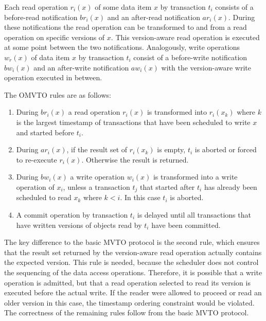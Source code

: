 \documentclass[10pt,final,journal]{IEEEtran}
\begin{document}
Each read operation $r_i(x)$ of some data item $x$ by transaction $t_i$ consists of a before-read notification $br_i(x)$ and an after-read notification $ar_i(x)$. During these notifications the read operation can be transformed to and from a read operation on specific versions of $x$. This version-aware read operation is executed at some point between the two notifications. Analogously,  write operations $w_r(x)$ of data item $x$ by transaction $t_i$ consist of a before-write notification $bw_i(x)$ and an after-write notification $aw_i(x)$ with the version-aware write operation executed in between.

The OMVTO rules are as follows:
\begin{enumerate}
\item During $br_i(x)$ a read operation $r_i(x)$ is transformed into $r_i(x_k)$ where $k$ is the largest timestamp of transactions that have been scheduled to write $x$ and started before $t_i$.
\item During $ar_i(x)$, if the result set of $r_i(x_k)$ is empty, $t_i$ is aborted or forced to re-execute $r_i(x)$. Otherwise the result is returned.
\item During $bw_i(x)$ a write operation $w_i(x)$ is transformed into a write operation of $x_i$, unless a transaction $t_j$ that started after $t_i$ has already been scheduled to read $x_k$ where $k < i$. In this case $t_i$ is aborted.
\item A commit operation by transaction $t_i$ is delayed until all transactions that have written versions of objects read by $t_i$ have been committed.
\end{enumerate}

The key difference to the basic MVTO protocol is the second rule, which ensures that the result set returned by the version-aware read operation actually contains the expected version. This rule is needed, because the scheduler does not control the sequencing of the data access operations. Therefore, it is possible that a write operation is admitted, but that a read operation selected to read its version is executed before the actual write. If the reader were allowed to proceed or read an older version in this case, the timestamp ordering constraint would be violated. The correctness of the remaining rules follow from the basic MVTO protocol.
\end{document}
